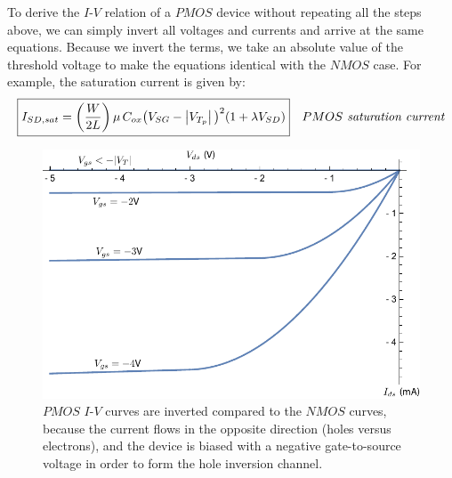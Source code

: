 To derive the $I$-$V$ relation of a $PMOS$ device without repeating all the steps above, we can simply invert all voltages and currents and arrive at the same equations.  Because we invert the terms, we take an absolute value of the threshold voltage to make the equations identical with the $NMOS$ case.  For example, the saturation current is given by:
    \begin{align}
        \Aboxed{I_{SD,sat} = \left(\frac{W}{2L}\right) \mu\,C_{ox}
                                {\big(V_{SG} - \left|V_{T_p}\right|\big)}^2 (1 + \lambda V_{SD})}
        &\textit{$PMOS$ saturation current}
        \label{eq:mosfet_ids_pmos}
    \end{align}
\newpage
\begin{figure}[t]
\centering
\includegraphics[width=\columnwidth]{idspmos}
\caption{$PMOS$ $I$-$V$ curves are inverted compared to the $NMOS$ curves, because the current flows in the opposite direction (holes versus electrons), and the device is biased with a negative gate-to-source voltage in order to form the hole inversion channel.}
\label{fig:idspmos}
\end{figure}
\vspace{1cm}
